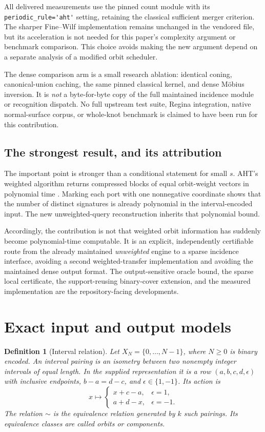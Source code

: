 \documentclass[11pt,letterpaper]{article}
\newtheorem{definition}[theorem]{Definition}
\newcommand{\code}[1]{\nolinkurl{#1}}
\begin{document}
All delivered measurements use the pinned count module with its
\code{periodic_rule='aht'} setting, retaining the classical sufficient merger
criterion. The sharper Fine--Wilf implementation remains unchanged in the
vendored file, but its acceleration is not needed for this paper's complexity
argument or benchmark comparison. This choice avoids making the new argument
depend on a separate analysis of a modified orbit scheduler.

The dense comparison arm is a small research ablation: identical coning,
canonical-union caching, the same pinned classical kernel, and dense M\"obius
inversion. It is \emph{not} a byte-for-byte copy of the full maintained incidence
module or recognition dispatch. No full upstream test suite, Regina integration,
native normal-surface corpus, or whole-knot benchmark is claimed to have been
run for this contribution.

\subsection{The strongest result, and its attribution}
The important point is stronger than a conditional statement for small $s$.
AHT's weighted algorithm returns compressed blocks of equal orbit-weight
vectors in polynomial time \cite[Section 6, Theorem 16]{aht}. Marking each port
with one nonnegative coordinate shows that the number of distinct signatures
is already polynomial in the interval-encoded input. The new unweighted-query
reconstruction inherits that polynomial bound.

Accordingly, the contribution is not that weighted orbit information has
suddenly become polynomial-time computable. It is an explicit, independently
certifiable route from the already maintained \emph{unweighted} engine to a
sparse incidence interface, avoiding a second weighted-transfer implementation
and avoiding the maintained dense output format. The output-sensitive oracle
bound, the sparse local certificate, the support-reusing binary-cover extension,
and the measured implementation are the repository-facing developments.

\section{Exact input and output models}
\label{sec:model}

\begin{definition}[Interval relation]
Let $X_N=\{0,\ldots,N-1\}$, where $N\geq0$ is binary encoded. An interval pairing
is an isometry between two nonempty integer intervals of equal length. In the
supplied representation it is a row $(a,b,c,d,\epsilon)$ with inclusive
endpoints, $b-a=d-c$, and $\epsilon\in\{1,-1\}$. Its action is
\[
 x\longmapsto
 \begin{cases}
 x+c-a,&\epsilon=1,\\
 a+d-x,&\epsilon=-1.
 \end{cases}
\]
The relation $\sim$ is the equivalence relation generated by $k$ such pairings.
Its equivalence classes are called orbits or components.
\end{definition}
\end{document}

